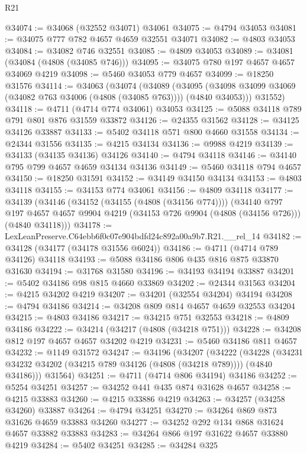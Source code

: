 \begin{lexlean}{R21}
\begin{coremodule}
@34074 := @34068 (@32552 @34071) @34061
@34075 := @4794 @34053
@34081 := @34075 @777 @782 @4657 @4659 @32551 @34071
@34082 := @4803 @34053
@34084 := @34082 @746 @32551
@34085 := @4809 @34053
@34089 := @34081 (@34084 (@4808 (@34085 @746)))
@34095 := @34075 @780 @197 @4657 @4657 @34069 @4219
@34098 := @5460 @34053 @779 @4657
@34099 := @18250 @31576
@34114 := @34063
    (@34074
      (@34089
        (@34095 (@34098 @34099 @34069 (@34082 @763 @34006 (@4808 (@34085 @763)))) (@4840 @34053)))
      @31552)
@34118 := @4711 (@4714 @774 @34061) @34053
@34125 := @5088 @34118 @789 @791 @801 @876 @31559 @33872
@34126 := @24355 @31562
@34128 := @34125 @34126 @33887
@34133 := @5402 @34118 @571 @800 @4660 @31558
@34134 := @24344 @31556
@34135 := @4215 @34134
@34136 := @9988 @4219
@34139 := @34133 (@34135 @34136) @34126
@34140 := @4794 @34118
@34146 := @34140 @795 @799 @4657 @4659 @34134 @34136
@34149 := @5460 @34118 @794 @4657
@34150 := @18250 @31591
@34152 := @34149 @34150 @34134
@34153 := @4803 @34118
@34155 := @34153 @774 @34061
@34156 := @4809 @34118
@34177 := @34139
    (@34146
      (@34152 (@34155 (@4808 (@34156 @774))))
      (@34140
        @797
        @197
        @4657
        @4657
        @9904
        @4219
        (@34153 @726 @9904 (@4808 (@34156 @726)))
        (@4840 @34118)))
@34178 := LexLeanPreserve.C64ebb6f0c07e904bdfd24c892a00a9b7.R21.__rel_14
@34182 := @34128 (@34177 (@34178 @31556 @6024))
@34186 := @4711 (@4714 @789 @34126) @34118
@34193 := @5088 @34186 @806 @435 @816 @875 @33870 @31630
@34194 := @31768 @31580
@34196 := @34193 @34194 @33887
@34201 := @5402 @34186 @98 @815 @4660 @33869
@34202 := @24344 @31563
@34204 := @4215 @34202 @4219
@34207 := @34201 (@32554 @34204) @34194
@34208 := @4794 @34186
@34214 := @34208 @809 @814 @4657 @4659 @32553 @34204
@34215 := @4803 @34186
@34217 := @34215 @751 @32553
@34218 := @4809 @34186
@34222 := @34214 (@34217 (@4808 (@34218 @751)))
@34228 := @34208 @812 @197 @4657 @4657 @34202 @4219
@34231 := @5460 @34186 @811 @4657
@34232 := @1149 @31572
@34247 := @34196
    (@34207
      (@34222
        (@34228 (@34231 @34232 @34202 (@34215 @789 @34126 (@4808 (@34218 @789)))) (@4840 @34186)))
      @31564)
@34251 := @4711 (@4714 @806 @34194) @34186
@34252 := @5254 @34251
@34257 := @34252 @441 @435 @874 @31628 @4657
@34258 := @4215 @33883
@34260 := @4215 @33886 @4219
@34263 := @34257 (@34258 @34260) @33887
@34264 := @4794 @34251
@34270 := @34264 @869 @873 @31626 @4659 @33883 @34260
@34277 := @34252 @292 @134 @868 @31624 @4657 @33882 @33883
@34283 := @34264 @866 @197 @31622 @4657 @33880 @4219
@34284 := @5402 @34251
@34285 := @34284 @325

\end{coremodule}
\end{lexlean}
